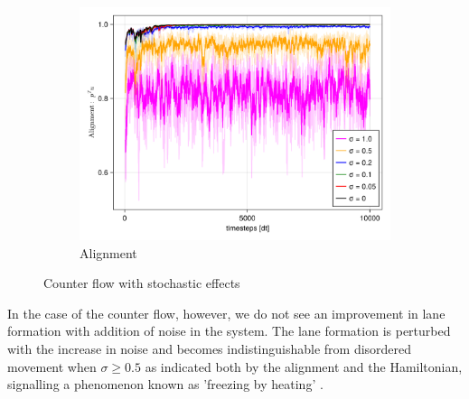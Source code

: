 \begin{itemize}
\begin{figure}[H]
\begin{subfigure}{.49\textwidth}
            \includegraphics[width=\linewidth]{figures/ch5_collective_stoch/align_stochastic_counter.png}
            \caption{Alignment}
            \label{plot:stoc_counter_alignment}
        \end{subfigure}
        \caption{Counter flow with stochastic effects}
        \label{plot:stoc_counter}
    \end{figure}
    In the case of the counter flow, however, we do not see an improvement in lane formation with addition of noise in the system. The lane formation is perturbed with the increase in noise and becomes indistinguishable from disordered movement when $\sigma \geq 0.5$ as indicated both by the alignment and the Hamiltonian, signalling a phenomenon known as 'freezing by heating' \cite{helbing2000freezing}.


\end{itemize}
